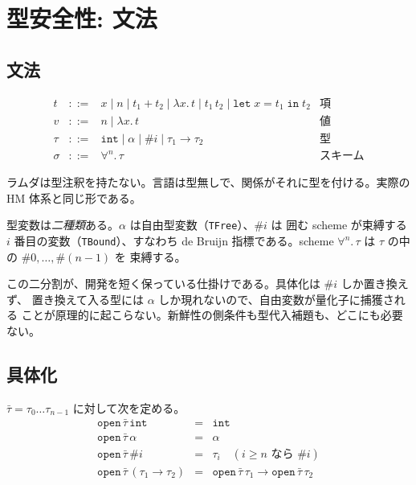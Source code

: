\documentclass[11pt,a4paper]{ltjsarticle}
\newcommand{\tint}{\mathtt{int}}
\begin{document}
\section{型安全性: 文法}
\label{sec:safe-syntax}

\subsection{文法}

\[
\begin{array}{lcll}
  t & ::= & x \mid n \mid t_1 + t_2 \mid \lambda x.\,t \mid t_1\,t_2
            \mid \mathtt{let}\;x = t_1\;\mathtt{in}\;t_2
    & \text{項}\\[2pt]
  v & ::= & n \mid \lambda x.\,t
    & \text{値}\\[2pt]
  \tau & ::= & \tint \mid \alpha \mid \#i \mid \tau_1 \to \tau_2
    & \text{型}\\[2pt]
  \sigma & ::= & \forall^{n}.\,\tau
    & \text{スキーム}
\end{array}
\]

ラムダは型注釈を持たない。言語は型無しで、関係がそれに型を付ける。実際の
HM 体系と同じ形である。

型変数は\emph{二種類}ある。$\alpha$ は自由型変数（\texttt{TFree}）、$\#i$ は
囲む scheme が束縛する $i$ 番目の変数（\texttt{TBound}）、すなわち de Bruijn
指標である。scheme $\forall^{n}.\,\tau$ は $\tau$ の中の $\#0,\dots,\#(n-1)$ を
束縛する。

この二分割が、開発を短く保っている仕掛けである。具体化は $\#i$ しか置き換えず、
置き換えて入る型には $\alpha$ しか現れないので、自由変数が量化子に捕獲される
ことが原理的に起こらない。新鮮性の側条件も型代入補題も、どこにも必要ない。

\subsection{具体化}

$\bar\tau = \tau_0 \dots \tau_{n-1}$ に対して次を定める。
\[
\begin{array}{lcl}
  \mathtt{open}\,\bar\tau\,\tint &=& \tint \\
  \mathtt{open}\,\bar\tau\,\alpha &=& \alpha \\
  \mathtt{open}\,\bar\tau\,\#i &=& \tau_i \quad (i \geq n \text{ なら } \#i) \\
  \mathtt{open}\,\bar\tau\,(\tau_1 \to \tau_2) &=&
    \mathtt{open}\,\bar\tau\,\tau_1 \to \mathtt{open}\,\bar\tau\,\tau_2
\end{array}
\]
\end{document}

